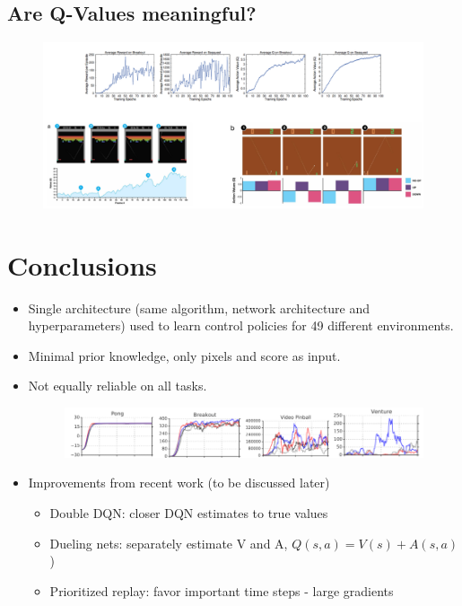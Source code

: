 \documentclass{tufte-handout}
\begin{document}
\subsection{Are Q-Values meaningful?}
\begin{figure}[h]
  \centering
  \includegraphics[width=\linewidth]{qval}
\end{figure}


\section{Conclusions}
\begin{itemize}
  \item Single architecture (same algorithm, network architecture and hyperparameters) used to learn control policies for 49 different environments.
  \item Minimal prior knowledge, only pixels and score as input.
  \item Not equally reliable on all tasks.
    \begin{figure}[h]
      \centering
      \includegraphics[width=\linewidth]{reliable}
    \end{figure}
  \item Improvements from recent work (to be discussed later)
    \begin{itemize}
      \item Double DQN: closer DQN estimates to true values
      \item Dueling nets: separately estimate V and A, $Q(s,a)=V(s) + A(s,a)$) 
      \item Prioritized replay: favor important time steps - large gradients
    \end{itemize}
\end{itemize}
\end{document}
